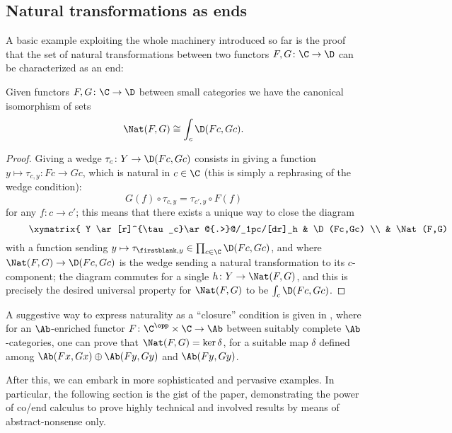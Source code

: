 \subsection{Natural transformations as ends}
A basic example exploiting the whole machinery introduced so far is the proof that the set of natural transformations between two functors $F,G\colon \C\to \D$ can be characterized as an end:
\begin{theorem}\label{naturalu}
Given functors $F,G\colon \C\to \D$ between small categories we have the canonical isomorphism of sets
\[
\Nat(F,G)\cong \int_c \D(Fc,Gc).
\]
\end{theorem}
\begin{proof}
Giving a wedge $\tau_c\colon Y\to \D(Fc,Gc)$ consists in giving a function $y\mapsto \tau_{c,y}\colon Fc\to Gc$, which is natural in $c\in \C$ (this is simply a rephrasing of the wedge condition):
\[
G(f)\circ \tau_{c,y} = \tau_{c',y}\circ F(f)
\]
for any $f\colon c\to c'$; this means that there exists a unique way to close the diagram
\[
\vcenter{\xymatrix{
Y \ar[r]^{\tau_c}\ar@{.>}@/_1pc/[dr]_h & \D(Fc,Gc)  \\
 & \Nat(F,G) \ar[u]
}}
\]
with a function sending $y\mapsto \tau_{\firstblank,y}\in \prod_{c\in\C} \D(Fc,Gc)$, and where $\Nat(F,G)\to\D(Fc,Gc)$ is the wedge sending a natural transformation to its $c$\hyp{}component; the diagram commutes for a single $h\colon Y\to \Nat(F,G)$, and this is precisely the desired universal property for $\Nat(F,G)$ to be $\int_c\D(Fc,Gc)$.
\end{proof}
\begin{remark}
A suggestive way to express naturality as a ``closure'' condition is given in \cite[\textbf{4.1.1}]{yoneda}, where for an $\Ab$\hyp{}enriched functor $F\colon \C^\opp\times \C\to \Ab$ between suitably complete $\Ab$\hyp{}categories, one can prove that $\Nat(F,G)=\ker\delta$, for a suitable map $\delta$ defined among $\Ab(Fx, Gx)\oplus \Ab(Fy, Gy)$ and $\Ab(Fy, Gy)$.
\end{remark}
After this, we can embark in more sophisticated and pervasive examples. In particular, the following section is the gist of the paper, demonstrating the power of co/end calculus to prove highly technical and involved results by means of abstract\hyp{}nonsense only.
